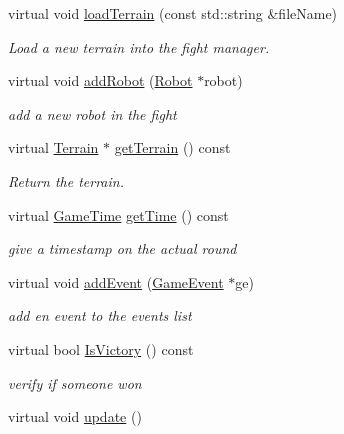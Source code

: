 \begin{DoxyCompactItemize}
\item 
virtual void \hyperlink{class_fight_manager_a5693c049f006dd4235f82f7a78bb53a8}{load\+Terrain} (const std\+::string \&file\+Name)
\begin{DoxyCompactList}\small\item\em Load a new terrain into the fight manager. \end{DoxyCompactList}\item 
virtual void \hyperlink{class_fight_manager_ae244d39ff3b816f3385ef0478f19eb5e}{add\+Robot} (\hyperlink{class_robot}{Robot} $\ast$robot)
\begin{DoxyCompactList}\small\item\em add a new robot in the fight \end{DoxyCompactList}\item 
virtual \hyperlink{class_terrain}{Terrain} $\ast$ \hyperlink{class_fight_manager_af23b8f57fc730aa983fdadc69e0599b5}{get\+Terrain} () const 
\begin{DoxyCompactList}\small\item\em Return the terrain. \end{DoxyCompactList}\item 
virtual \hyperlink{class_game_time}{Game\+Time} \hyperlink{class_fight_manager_aea369fd69fde5ff1da97cf1720f17ac5}{get\+Time} () const 
\begin{DoxyCompactList}\small\item\em give a timestamp on the actual round \end{DoxyCompactList}\item 
virtual void \hyperlink{class_fight_manager_ad2cae62ea87ba4a4424e7de1c75145b2}{add\+Event} (\hyperlink{class_game_event}{Game\+Event} $\ast$ge)
\begin{DoxyCompactList}\small\item\em add en event to the events list \end{DoxyCompactList}\item 
virtual bool \hyperlink{class_fight_manager_abaffb72b5353358c5560aaa26636cf49}{Is\+Victory} () const 
\begin{DoxyCompactList}\small\item\em verify if someone won \end{DoxyCompactList}\item 
virtual void \hyperlink{class_fight_manager_aff6765fc0a4e22564d39f03210579129}{update} ()\hypertarget{class_fight_manager_aff6765fc0a4e22564d39f03210579129}{}\label{class_fight_manager_aff6765fc0a4e22564d39f03210579129}


\end{DoxyCompactItemize}
